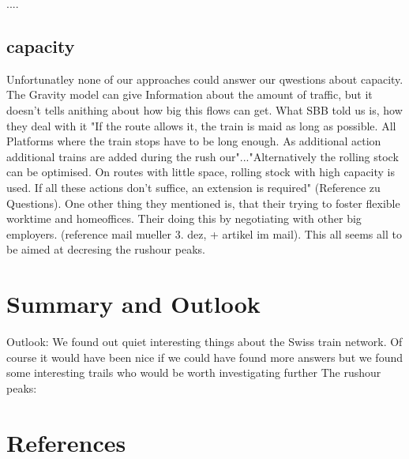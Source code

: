 \documentclass[11pt]{article}
\begin{document}
....

\subsection{capacity}

Unfortunatley none of our approaches could answer our qwestions about capacity. The Gravity model can give Information about the amount of traffic, but it doesn't tells anithing about how big this flows can get. What SBB told us is, how they deal with it "If the route allows it, the train is maid as long as possible. All Platforms where the train stops have to be long enough. As additional action additional trains are added during the rush our"..."Alternatively the rolling stock can be optimised. On routes with little space, rolling stock with high capacity is used. If all these actions don't suffice, an extension is required" (Reference zu Questions). One other thing they mentioned is, that their trying to foster flexible worktime and homeoffices. Their doing this by negotiating with other big employers. (reference mail mueller 3. dez, + artikel im mail). This all seems all to be aimed at decresing the rushour peaks.  




\section{Summary and Outlook}

Outlook:
We found out quiet interesting things about the Swiss train network. Of course it would have been nice if we could have found more answers but we found some interesting trails who would be worth investigating further
The rushour peaks: 


\section{References}


\end{document}
